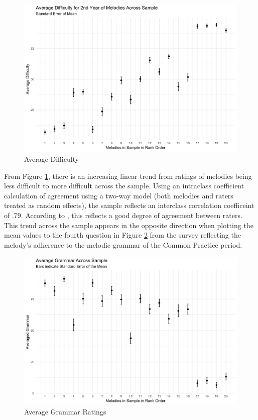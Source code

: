 \documentclass[12pt,]{book}
\begin{document}
\begin{figure}

{\centering \includegraphics[width=1\linewidth]{img/difficulty_plot} 

}

\caption{Average Difficulty}\label{fig:diffplot}
\end{figure}

From Figure \ref{fig:diffplot}, there is an increasing linear trend from ratings of melodies being less difficult to more difficult across the sample.
Using an intraclass coefficient calculation of agreement using a two-way model (both melodies and raters treated as random effects), the sample reflects an interclass correlation coefficeint of .79.
According to \citet{kooGuidelineSelectingReporting2016}, this reflects a good degree of agreement between raters.
This trend across the sample appears in the opposite direction when plotting the mean values to the fourth question in Figure \ref{fig:grammarplot} from the survey reflecting the melody's adherence to the melodic grammar of the Common Practice period.

\begin{figure}

{\centering \includegraphics[width=1\linewidth]{img/grammar_plot} 

}

\caption{Average Grammar Ratings}\label{fig:grammarplot}
\end{figure}
\end{document}

